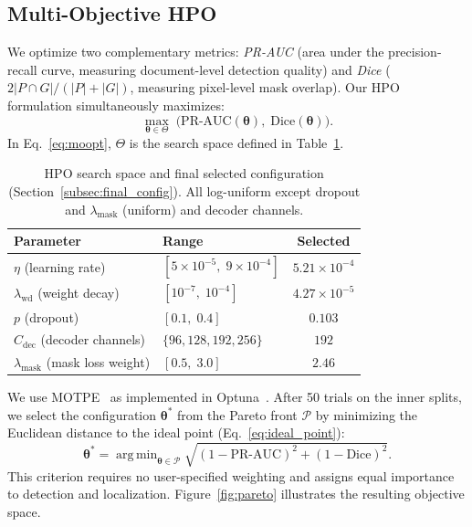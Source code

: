 \documentclass[final,5p,times,twocolumn,number]{elsarticle}
\DeclareMathOperator*{\argmin}{arg\,min}
\newcommand{\rev}[1]{#1}
\begin{document}
\subsection{Multi-Objective HPO}
\label{subsec:hpo}

We optimize two complementary metrics: \emph{PR-AUC} (area under the
precision-recall curve, measuring document-level detection quality) and
\emph{Dice} ($2|P \cap G|/(|P|+|G|)$, measuring pixel-level mask overlap).
Our HPO formulation simultaneously maximizes:
\begin{equation}
  \max_{\boldsymbol{\theta} \in \Theta}\; \bigl(\text{PR-AUC}(\boldsymbol{\theta}),\;
  \text{Dice}(\boldsymbol{\theta})\bigr).
  \label{eq:moopt}
\end{equation}
\rev{In Eq.~\ref{eq:moopt},} $\Theta$ \rev{is the search space defined in
Table~\ref{tab:hpo_space}}.

\begin{table}[!t]
  \centering
  \caption{HPO search space \rev{and final selected configuration
           (Section~\ref{subsec:final_config}). All log-uniform except
           dropout and $\lambda_{\text{mask}}$ (uniform) and decoder
           channels}.}
  \label{tab:hpo_space}
  \begin{tabular}{llc}
    \toprule
    Parameter & Range & \rev{Selected} \\
    \midrule
    $\eta$ (learning rate) & $[5{\times}10^{-5},\; 9{\times}10^{-4}]$ & \rev{$5.21{\times}10^{-4}$} \\
    $\lambda_{\text{wd}}$ (weight decay) & $[10^{-7},\; 10^{-4}]$ & \rev{$4.27{\times}10^{-5}$} \\
    $p$ (dropout) & $[0.1,\; 0.4]$ & \rev{$0.103$} \\
    $C_{\text{dec}}$ (decoder channels) & $\{96, 128, 192, 256\}$ & \rev{$192$} \\
    $\lambda_{\text{mask}}$ (mask loss weight) & $[0.5,\; 3.0]$ & \rev{$2.46$} \\
    \bottomrule
  \end{tabular}
\end{table}

We use MOTPE~\citep{motpe2022} as implemented in Optuna~\citep{optuna2019}.
After 50 trials on the inner splits, we select the configuration
$\boldsymbol{\theta}^*$ from the Pareto front $\mathcal{P}$ by minimizing the
Euclidean distance to the ideal point \rev{(Eq.~\ref{eq:ideal_point})}:
\begin{equation}
  \boldsymbol{\theta}^* = \argmin_{\boldsymbol{\theta} \in \mathcal{P}}
    \sqrt{(1 - \text{PR-AUC})^2 + (1 - \text{Dice})^2}.
  \label{eq:ideal_point}
\end{equation}
This criterion requires no user-specified weighting and assigns equal importance
to detection and localization. Figure~\ref{fig:pareto} illustrates the
resulting objective space.
\end{document}
